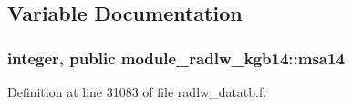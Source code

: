 \subsection{Variable Documentation}
\subsubsection[{\texorpdfstring{msa14}{msa14}}]{\setlength{\rightskip}{0pt plus 5cm}integer, public module\+\_\+radlw\+\_\+kgb14\+::msa14}\hypertarget{namespacemodule__radlw__kgb14_a9357fbaa5663438f0c0062a45c99a8d4}{}\label{namespacemodule__radlw__kgb14_a9357fbaa5663438f0c0062a45c99a8d4}


Definition at line 31083 of file radlw\+\_\+datatb.\+f.

